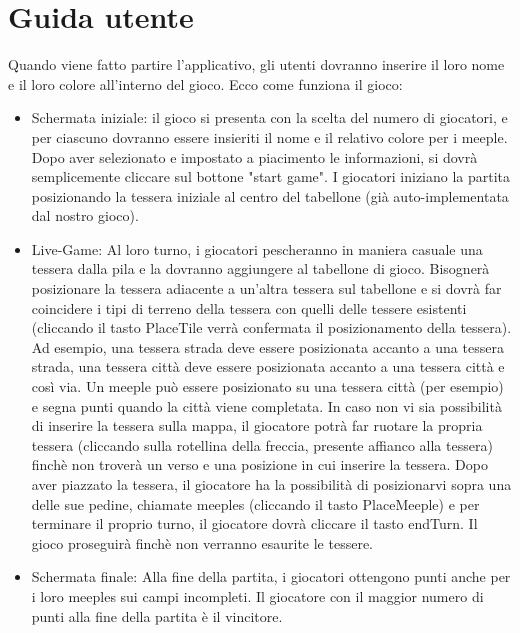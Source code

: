 \section{Guida utente}
Quando viene fatto partire l'applicativo, gli utenti dovranno inserire il loro nome e il loro colore all'interno del gioco. Ecco come funziona il gioco: 
\begin{itemize}
    \item Schermata iniziale: il gioco si presenta con la scelta del numero di giocatori, e per ciascuno dovranno essere insieriti il nome e il relativo colore per i meeple. Dopo aver selezionato e impostato a piacimento le informazioni, si dovrà semplicemente cliccare sul bottone "start game". I giocatori iniziano la partita posizionando la tessera iniziale al centro del tabellone (già auto-implementata dal nostro gioco).
    \item Live-Game: Al loro turno, i giocatori pescheranno in maniera casuale una tessera dalla pila e la dovranno aggiungere al tabellone di gioco. Bisognerà posizionare la tessera adiacente a un'altra tessera sul tabellone e si dovrà far coincidere i tipi di terreno della tessera con quelli delle tessere esistenti (cliccando il tasto PlaceTile verrà confermata il posizionamento della tessera). Ad esempio, una tessera strada deve essere posizionata accanto a una tessera strada, una tessera città deve essere posizionata accanto a una tessera città e così via. Un meeple può essere posizionato su una tessera città (per esempio) e segna punti quando la città viene completata. In caso non vi sia possibilità di inserire la tessera sulla mappa, il giocatore potrà far ruotare la propria tessera (cliccando sulla rotellina della freccia, presente affianco alla tessera) finchè non troverà un verso e una posizione in cui inserire la tessera. Dopo aver piazzato la tessera, il giocatore ha la possibilità di posizionarvi sopra una delle sue pedine, chiamate meeples (cliccando il tasto PlaceMeeple) e per terminare il proprio turno, il giocatore dovrà cliccare il tasto endTurn. Il gioco proseguirà finchè non verranno esaurite le tessere.
    \item Schermata finale: Alla fine della partita, i giocatori ottengono punti anche per i loro meeples sui campi incompleti. Il giocatore con il maggior numero di punti alla fine della partita è il vincitore. 
\end{itemize}